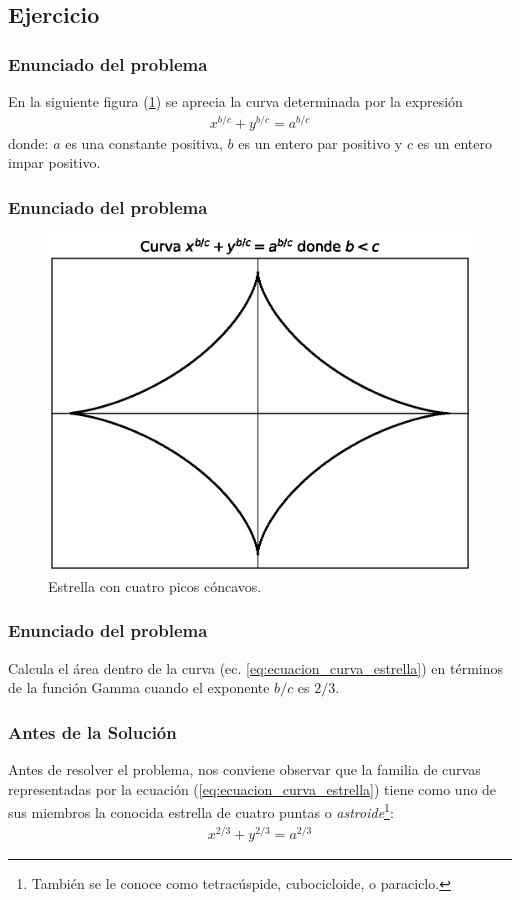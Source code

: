 \subsection{Ejercicio}
\begin{frame}
\frametitle{Enunciado del problema}
En la siguiente figura (\ref{fig:figura_curva_estrella}) se aprecia la curva determinada por la expresión
\begin{align}
x^{b/c} + y^{b/c} = a^{b/c}
\label{eq:ecuacion_curva_estrella}
\end{align}
donde: $a$ es una constante positiva, $b$ es un entero par positivo y $c$ es un entero impar positivo.
\end{frame}
\begin{frame}
\frametitle{Enunciado del problema}
\begin{figure}[H]
    \centering
    \includegraphics[scale=0.5]{Imagenes/plot_curva_estrella_01.eps}
    \caption{Estrella con cuatro picos cóncavos.}
    \label{fig:figura_curva_estrella}
\end{figure}
\end{frame}
\begin{frame}
\frametitle{Enunciado del problema}
Calcula el área dentro de la curva (ec. \ref{eq:ecuacion_curva_estrella}) en términos de la función Gamma cuando el exponente $b/c$ es $2/3$.
\end{frame}
\begin{frame}
\frametitle{Antes de la Solución}
Antes de resolver el problema, nos conviene observar que la familia de curvas representadas por la ecuación (\ref{eq:ecuacion_curva_estrella}) tiene como uno de sus miembros la conocida estrella de cuatro puntas o \emph{astroide}\footnote{También se le conoce como tetracúspide, cubocicloide, o paraciclo.}:
\begin{align*}
x^{2/3} + y^{2/3} = a^{2/3}
\end{align*}
\end{frame}
